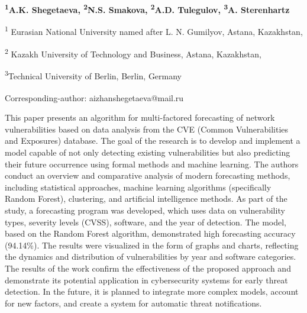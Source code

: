 
\begin{articleheader}

{\bfseries
\textsuperscript{1}A.K. Shegetaeva\textsuperscript{\envelope },
\textsuperscript{2}N.S. Smakova,
\textsuperscript{2}A.D. Tulegulov,
\textsuperscript{3}A. Sterenhartz
}
\end{articleheader}

\begin{affiliation}
\textsuperscript{1} Eurasian National University named after L. N. Gumilyov, Astana, Kazakhstan,

\textsuperscript{2} Kazakh University of Technology and Business, Astana, Kazakhstan,

\textsuperscript{3}Technical University of Berlin, Berlin, Germany

\raggedright \textsuperscript{\envelope }Corresponding-author: aizhanshegetaeva@mail.ru
\end{affiliation}

This paper presents an algorithm for multi-factored forecasting of
network vulnerabilities based on data analysis from the CVE (Common
Vulnerabilities and Exposures) database. The goal of the research is to
develop and implement a model capable of not only detecting existing
vulnerabilities but also predicting their future occurrence using formal
methods and machine learning. The authors conduct an overview and
comparative analysis of modern forecasting methods, including
statistical approaches, machine learning algorithms (specifically Random
Forest), clustering, and artificial intelligence methods. As part of the
study, a forecasting program was developed, which uses data on
vulnerability types, severity levels (CVSS), software, and the year of
detection. The model, based on the Random Forest algorithm, demonstrated
high forecasting accuracy (94.14\%). The results were visualized in the
form of graphs and charts, reflecting the dynamics and distribution of
vulnerabilities by year and software categories. The results of the work
confirm the effectiveness of the proposed approach and demonstrate its
potential application in cybersecurity systems for early threat
detection. In the future, it is planned to integrate more complex
models, account for new factors, and create a system for automatic
threat notifications.

